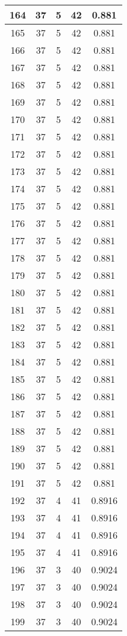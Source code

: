 \documentclass[letterpaper, 12pt]{article}
\begin{document}
\begin{longtable}{|c|c|c|c|c|}
\hline
164 & 37 & 5 & 42 & 0.881 \\
\hline
165 & 37 & 5 & 42 & 0.881 \\
\hline
166 & 37 & 5 & 42 & 0.881 \\
\hline
167 & 37 & 5 & 42 & 0.881 \\
\hline
168 & 37 & 5 & 42 & 0.881 \\
\hline
169 & 37 & 5 & 42 & 0.881 \\
\hline
170 & 37 & 5 & 42 & 0.881 \\
\hline
171 & 37 & 5 & 42 & 0.881 \\
\hline
172 & 37 & 5 & 42 & 0.881 \\
\hline
173 & 37 & 5 & 42 & 0.881 \\
\hline
174 & 37 & 5 & 42 & 0.881 \\
\hline
175 & 37 & 5 & 42 & 0.881 \\
\hline
176 & 37 & 5 & 42 & 0.881 \\
\hline
177 & 37 & 5 & 42 & 0.881 \\
\hline
178 & 37 & 5 & 42 & 0.881 \\
\hline
179 & 37 & 5 & 42 & 0.881 \\
\hline
180 & 37 & 5 & 42 & 0.881 \\
\hline
181 & 37 & 5 & 42 & 0.881 \\
\hline
182 & 37 & 5 & 42 & 0.881 \\
\hline
183 & 37 & 5 & 42 & 0.881 \\
\hline
184 & 37 & 5 & 42 & 0.881 \\
\hline
185 & 37 & 5 & 42 & 0.881 \\
\hline
186 & 37 & 5 & 42 & 0.881 \\
\hline
187 & 37 & 5 & 42 & 0.881 \\
\hline
188 & 37 & 5 & 42 & 0.881 \\
\hline
189 & 37 & 5 & 42 & 0.881 \\
\hline
190 & 37 & 5 & 42 & 0.881 \\
\hline
191 & 37 & 5 & 42 & 0.881 \\
\hline
192 & 37 & 4 & 41 & 0.8916 \\
\hline
193 & 37 & 4 & 41 & 0.8916 \\
\hline
194 & 37 & 4 & 41 & 0.8916 \\
\hline
195 & 37 & 4 & 41 & 0.8916 \\
\hline
196 & 37 & 3 & 40 & 0.9024 \\
\hline
197 & 37 & 3 & 40 & 0.9024 \\
\hline
198 & 37 & 3 & 40 & 0.9024 \\
\hline
199 & 37 & 3 & 40 & 0.9024 \\
\hline
\end{longtable}
\end{document}
